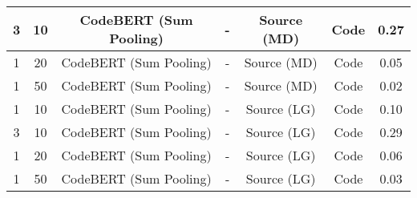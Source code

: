 \begin{longtable}{|c|c|c|c|c|c|c|}
\hline
3 & 10 & CodeBERT (Sum Pooling) & - & Source (MD) & Code & 0.27 \\
\hline
1 & 20 & CodeBERT (Sum Pooling) & - & Source (MD) & Code & 0.05 \\
\hline
1 & 50 & CodeBERT (Sum Pooling) & - & Source (MD) & Code & 0.02 \\
\hline
1 & 10 & CodeBERT (Sum Pooling) & - & Source (LG) & Code & 0.10 \\
\hline
3 & 10 & CodeBERT (Sum Pooling) & - & Source (LG) & Code & 0.29 \\
\hline
1 & 20 & CodeBERT (Sum Pooling) & - & Source (LG) & Code & 0.06 \\
\hline
1 & 50 & CodeBERT (Sum Pooling) & - & Source (LG) & Code & 0.03 \\
\hline
\end{longtable}
